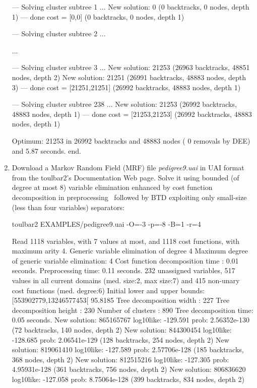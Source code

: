 \begin{enumerate}
{\begin{DoxyCode}
--- Solving cluster subtree 1 ...
New solution: 0 (0 backtracks, 0 nodes, depth 1)
---  done  cost = [0,0] (0 backtracks, 0 nodes, depth 1)

--- Solving cluster subtree 2 ...

...

--- Solving cluster subtree 3 ...
New solution: 21253 (26963 backtracks, 48851 nodes, depth 2)
New solution: 21251 (26991 backtracks, 48883 nodes, depth 3)
---  done  cost = [21251,21251] (26992 backtracks, 48883 nodes, depth 1)

--- Solving cluster subtree 238 ...
New solution: 21253 (26992 backtracks, 48883 nodes, depth 1)
---  done  cost = [21253,21253] (26992 backtracks, 48883 nodes, depth 1)

Optimum: 21253 in 26992 backtracks and 48883 nodes ( 0 removals by DEE) and 5.87 seconds.
end.
\end{DoxyCode}}
\item Download a Markov Random Field (MRF) file {\em pedigree9.uai} in UAI format from the toulbar2's Documentation Web page. Solve it using bounded (of degree at most 8) variable elimination enhanced by cost function decomposition in preprocessing~\cite{Favier11a} followed by BTD exploiting only small-size (less than four variables) separators:
\begin{DoxyCode}
	toulbar2 EXAMPLES/pedigree9.uai -O=-3 -p=-8 -B=1 -r=4
\end{DoxyCode}
{\scriptsize
\begin{DoxyCode}
Read 1118 variables, with 7 values at most, and 1118 cost functions, with maximum arity 4.
Generic variable elimination of degree 4
Maximum degree of generic variable elimination: 4
Cost function decomposition time : 0.01 seconds.
Preprocessing time: 0.11 seconds.
232 unassigned variables, 517 values in all current domains (med. size:2, max size:7) and 415 non-unary cost functions (med. degree:6)
Initial lower and upper bounds: [553902779,13246577453[ 95.8185%
Tree decomposition width  : 227
Tree decomposition height : 230
Number of clusters        : 890
Tree decomposition time: 0.05 seconds.
New solution: 865165767 log10like: -129.591 prob: 2.56352e-130 (72 backtracks, 140 nodes, depth 2)
New solution: 844300454 log10like: -128.685 prob: 2.06541e-129 (128 backtracks, 254 nodes, depth 2)
New solution: 819061410 log10like: -127.589 prob: 2.57706e-128 (185 backtracks, 368 nodes, depth 2)
New solution: 812515216 log10like: -127.305 prob: 4.95931e-128 (361 backtracks, 756 nodes, depth 2)
New solution: 806836620 log10like: -127.058 prob: 8.75064e-128 (399 backtracks, 834 nodes, depth 2)

\end{DoxyCode}}
\end{enumerate}
